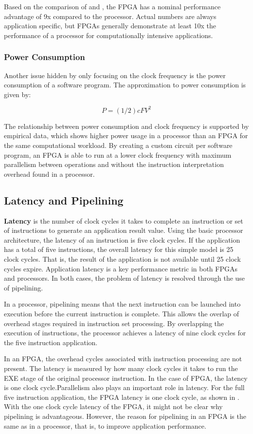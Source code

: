 Based on the comparison of  and , the FPGA has a nominal
performance advantage of 9x compared to the processor. Actual numbers are always
application specific, but FPGAs generally demonstrate at least 10x the performance of a
processor for computationally intensive applications.

\subsubsection{Power Consumption}
Another issue hidden by only focusing on the clock frequency is the power consumption of
a software program. The approximation to power consumption is given by:

\[ P = (1/2) cFV^2 \]

The relationship between power consumption and clock
frequency is supported by empirical data, which shows higher power usage in a processor
than an FPGA for the same computational workload. By creating a custom circuit per
software program, an FPGA is able to run at a lower clock frequency with maximum
parallelism between operations and without the instruction interpretation overhead found
in a processor.

\subsection{Latency and Pipelining}

\textbf{Latency} is the number of clock cycles it takes to complete an instruction or set of instructions to generate an application result value. Using the basic processor architecture, the latency of an instruction is five clock cycles. If the application has
a total of five instructions, the overall latency for this simple model is 25 clock cycles. That is, the result of the application is not available until 25 clock cycles expire. Application latency is a key performance metric in both FPGAs and processors. In both cases, the problem of latency is resolved through the use of pipelining. 

\par In a processor, pipelining means that the next instruction can be launched into execution before the
current instruction is complete. This allows the overlap of overhead stages required in
instruction set processing. By overlapping the execution of instructions, the processor achieves a latency of nine clock cycles for the five instruction application.

\par In an FPGA, the overhead cycles associated with instruction processing are not present. The
latency is measured by how many clock cycles it takes to run the EXE stage of the original
processor instruction. In the case of FPGA, the latency is one clock cycle.Parallelism also plays an important role in latency. For the full five instruction application, the FPGA latency is one clock cycle, as shown in . With the one clock cycle latency of
the FPGA, it might not be clear why pipelining is advantageous. However, the reason for
pipelining in an FPGA is the same as in a processor, that is, to improve application
performance.

